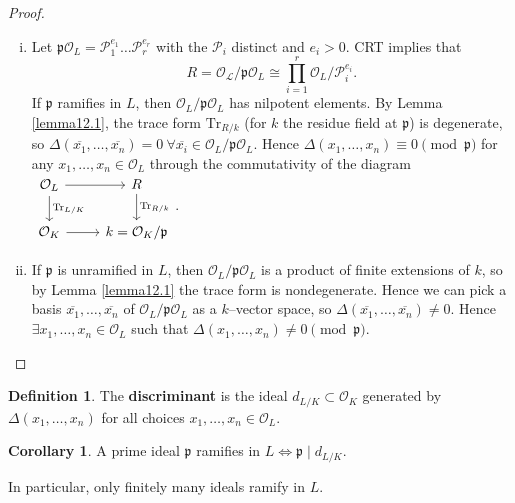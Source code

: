 \documentclass{article}
\theoremstyle{definition}
\newtheorem{cor}[theorem]{Corollary}
\newtheorem{defn}{Definition}[section]
\begin{document}
\begin{proof}
    \begin{enumerate}[(i)]
        \item Let $\mathfrak{p}\mathcal{O}_L = \mathcal{P}_1^{e_1}\ldots \mathcal{P}_r^{e_r}$ with the $\mathcal{P}_i$ distinct and $e_i > 0$. CRT implies that \[
        R = \mathcal{O_L}/\mathfrak{p}\mathcal{O}_L \cong \prod_{i=1}^{r} \mathcal{O}_L/\mathcal{P}_i^{e_i}.
        \]
        If $\mathfrak{p}$ ramifies in $L$, then $\mathcal{O}_L/\mathfrak{p}\mathcal{O}_L$ has nilpotent elements. By Lemma \ref{lemma12.1}, the trace form $\text{Tr}_{R/k}$ (for $k$ the residue field at $\mathfrak{p}$) is degenerate, so $\Delta(\overline{x_1},\ldots,\overline{x_n}) = 0 ~\forall \overline{x_i} \in \mathcal{O}_L/\mathfrak{p}\mathcal{O}_L$. Hence $\Delta(x_1,\ldots,x_n) \equiv 0 \pmod{\mathfrak{p}}$ for any $x_1,\ldots,x_n \in \mathcal{O}_L$ through the commutativity of the diagram 
        $\begin{tikzcd}[]
            \mathcal{O}_L & R\\
            \mathcal{O}_K & k = \mathcal{O}_K/\mathfrak{p}
            \arrow["", from=1-1, to=1-2]
            \arrow["\text{Tr}_{R/k}", from=1-2, to=2-2]
            \arrow["\text{Tr}_{L/K}", from=1-1, to=2-1]
            \arrow["", from=2-1, to=2-2]
        \end{tikzcd}$. 
        \item If $\mathfrak{p}$ is unramified in $L$, then $\mathcal{O}_L/\mathfrak{p}\mathcal{O}_L$ is a product of finite extensions of $k$, so by Lemma \ref{lemma12.1} the trace form is nondegenerate. Hence we can pick a basis $\overline{x_1},\ldots,\overline{x_n}$ of $\mathcal{O}_L/\mathfrak{p}\mathcal{O}_L$ as a $k$--vector space, so $\Delta(\overline{x_1},\ldots,\overline{x_n}) \neq 0$. Hence $\exists x_1,\ldots,x_n \in \mathcal{O}_L$ such that $\Delta(x_1,\ldots,x_n) \neq 0 \pmod{\mathfrak{p}}$.
    \end{enumerate}
\end{proof}
\begin{defn}
    The \textbf{discriminant} is the ideal $d_{L/K} \subset \mathcal{O}_K$ generated by $\Delta(x_1,\ldots,x_n)$ for all choices $x_1,\ldots,x_n \in \mathcal{O}_L$.
\end{defn}
\begin{cor}
    A prime ideal $\mathfrak{p}$ ramifies in $L \iff \mathfrak{p} \mid d_{L/K}$.
    \vspace{1mm}
     
    In particular, only finitely many ideals ramify in $L$.
\end{cor}
\end{document}
